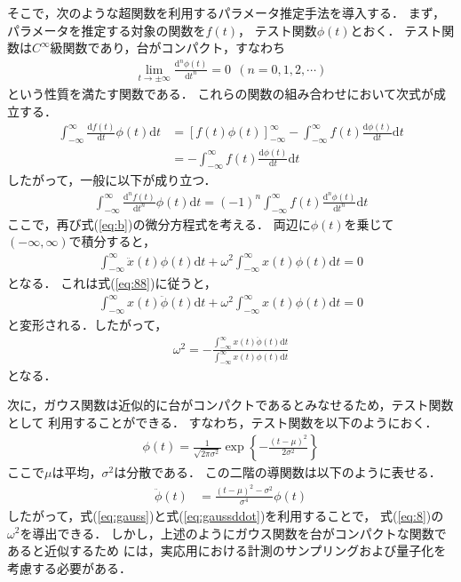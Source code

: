 \documentclass[usejistfm]{sice}
\begin{document}
そこで，次のような超関数を利用するパラメータ推定手法を導入する．
まず，パラメータを推定する対象の関数を$f(t)$，
テスト関数$\phi(t)$とおく．
テスト関数は$C^{\infty}$級関数であり，台がコンパクト，すなわち
\begin{align}
 \lim_{t\to \pm \infty}\frac{\mbox{d}^n\phi(t)}{\mbox{d}t^n} = 0\ \ (n=0,1,2,\cdots)
\end{align}
という性質を満たす関数である．
これらの関数の組み合わせにおいて次式が成立する．
\begin{align}
 \int_{-\infty}^{\infty} \frac{\mbox{d} f(t)}{\mbox{d}t}
 \phi(t)\mbox{d}t 
 &=\left[f(t)\phi(t) \right]_{-\infty}^{\infty} -\int_{-\infty}^{\infty} f(t) \frac{\mbox{d} \phi(t)}{\mbox{d}t}
 \mbox{d}t\nonumber\\
 &=-\int_{-\infty}^{\infty} f(t) \frac{\mbox{d} \phi(t)}{\mbox{d}t} \mbox{d}t
\end{align}
したがって，一般に以下が成り立つ．
\begin{align}
 \int_{-\infty}^{\infty} \frac{\mbox{d}^n f(t)}{\mbox{d}t^n}
 \phi(t)\mbox{d}t
 = (-1)^n  \int_{-\infty}^{\infty} f(t) \frac{\mbox{d}^n \phi(t)}{\mbox{d}t^n}
 \mbox{d}t
\label{eq:88}
\end{align}
%
ここで，再び式(\ref{eq:b})の微分方程式を考える．
両辺に$\phi(t)$を乗じて$(-\infty,\infty)$で積分すると，
\begin{align}
 \int_{-\infty}^{\infty}\ddot{x}(t)\phi (t) \mbox{d}t+
 \omega^2 \int_{-\infty}^{\infty}x(t)\phi (t)\mbox{d}t=0
\end{align}
となる．
これは式(\ref{eq:88})に従うと，
\begin{align}
 \int_{-\infty}^{\infty}x(t)\ddot{\phi} (t) \mbox{d}t+
 \omega^2 \int_{-\infty}^{\infty}x(t)\phi (t)\mbox{d}t=0
\end{align}
と変形される．したがって，
\begin{align}
\omega^2=-\frac{
 \int_{-\infty}^{\infty}x(t)\ddot{\phi} (t) \mbox{d}t}{
  \int_{-\infty}^{\infty}x(t)\phi (t)\mbox{d}t}
\label{eq:8}
\end{align}
となる．

次に，ガウス関数は近似的に台がコンパクトであるとみなせるため，テスト関数として
利用することができる．
すなわち，テスト関数を以下のようにおく．
\begin{align}
\phi(t)=\frac{1}{\sqrt{2\pi \sigma^2}}\exp \left\{-\frac{(t-\mu)^2}{2\sigma^2}\right\}
\label{eq:gauss}
\end{align}
ここで$\mu$は平均，$\sigma^2$は分散である．
この二階の導関数は以下のように表せる．
\begin{align}
\ddot{\phi}(t)&=\frac{(t-\mu)^2-\sigma^2}{\sigma^4}\phi(t)
\label{eq:gaussddot}
\end{align}
したがって，式(\ref{eq:gauss})と式(\ref{eq:gaussddot})を利用することで，
式(\ref{eq:8})の$\omega^2$を導出できる．
%
しかし，上述のようにガウス関数を台がコンパクトな関数であると近似するため
には，実応用における計測のサンプリングおよび量子化を考慮する必要がある．
\end{document}
